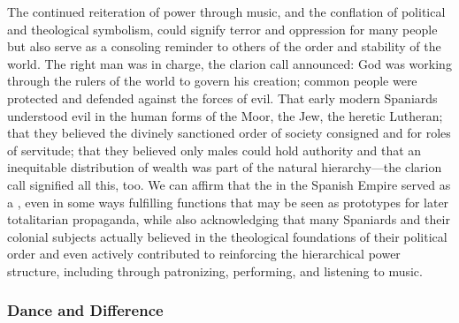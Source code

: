 The continued reiteration of power through music, and the conflation of
political and theological symbolism, could signify terror and oppression for
many people but also serve as a consoling reminder to others of the order and
stability of the world.
The right man was in charge, the clarion call announced: God was working
through the rulers of the world to govern his creation; common people were
protected and defended against the forces of evil.
That early modern Spaniards understood evil in the human forms of the Moor, the
Jew, the heretic Lutheran;
that they believed the divinely sanctioned order of society consigned
 and  for roles of servitude; 
that they believed only males could hold authority and that
an inequitable distribution of wealth was part of the natural hierarchy---the
clarion call signified all this, too.
We can affirm that the  in the Spanish Empire served as
a , even in some ways fulfilling functions that
may be seen as prototypes for later totalitarian propaganda, while also
acknowledging that many Spaniards and their colonial subjects actually believed
in the theological foundations of their political order and even actively
contributed to reinforcing the hierarchical power structure, including through
patronizing, performing, and listening to music.%
    \citXXX[Rodriguez, Sage, Rietbergen, Menache, etc]

\subsubsection{Dance and Difference}

